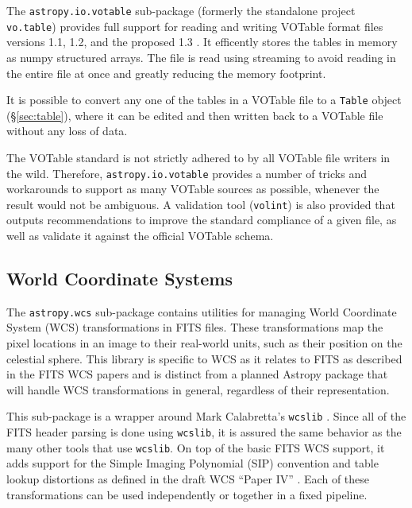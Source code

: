 \documentclass[traditabstract]{aa}
\begin{document}
\label{sec:votable}


The \texttt{astropy.io.votable} sub-package (formerly the standalone project
\texttt{vo.table}) provides full support for reading and writing VOTable format
files versions 1.1, 1.2, and the proposed 1.3
\citep{ochsenbein2004votable,ochsenbein2009votable}. It efficently stores the
tables in memory as \gls{numpy} structured arrays. The file is read using streaming
to avoid reading in the entire file at once and greatly reducing the memory
footprint.

It is possible to convert any one of the tables in a VOTable file to a
\texttt{Table} object (\S\ref{sec:table}), where it can be edited and then
written back to a VOTable file without any loss of data.

The VOTable standard is not strictly adhered to by all VOTable file writers in
the wild. Therefore, \texttt{astropy.io.votable} provides a number of tricks
and workarounds to support as many VOTable sources as possible, whenever the
result would not be ambiguous. A validation tool (\texttt{volint}) is also
provided that outputs recommendations to improve the standard compliance of a
given file, as well as validate it against the official VOTable schema.

\subsection{World Coordinate Systems}

\label{sec:wcs}


The \texttt{astropy.wcs} sub-package contains utilities for managing World
Coordinate System (WCS) transformations in FITS files. These transformations
map the pixel locations in an image to their real-world units, such as their
position on the celestial sphere. This library is specific to WCS as it relates
to FITS as described in the FITS WCS papers
\citep{greisen2002wcs,calabretta2002wcs,greisen2006wcs} and is distinct from a
planned Astropy package that will handle WCS transformations in general,
regardless of their representation.

This sub-package is a wrapper around Mark Calabretta's \texttt{wcslib}
\citep{calabretta2013wcslib}. Since all of the FITS header parsing is done
using \texttt{wcslib}, it is assured the same behavior as the many other tools
that use \texttt{wcslib}. On top of the basic FITS WCS support, it adds support
for the Simple Imaging Polynomial (SIP) convention and table lookup distortions
as defined in the draft WCS ``Paper IV'' \citep{calabretta2004wcs}. Each of
these transformations can be used independently or together in a fixed
pipeline.
\end{document}
